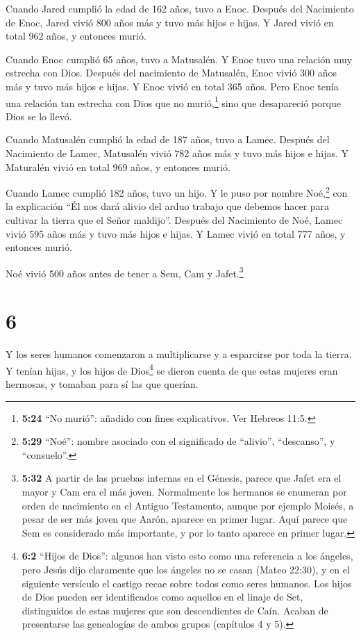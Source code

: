  Cuando Jared cumplió la edad de 162 años, tuvo a Enoc.
 Después del Nacimiento de Enoc, Jared vivió 800 años más y
tuvo más hijos e hijas.  Y Jared vivió en total 962 años, y
entonces murió.

 Cuando Enoc cumplió 65 años, tuvo a Matusalén.
 Y Enoc tuvo una relación muy estrecha con Dios. Después
del nacimiento de Matusalén, Enoc vivió 300 años más y tuvo más hijos e
hijas.  Y Enoc vivió en total 365 años.  Pero
Enoc tenía una relación tan estrecha con Dios que no murió,\footnote{\textbf{5:24}
  ``No murió'': añadido con fines explicativos. Ver Hebreos 11:5.} sino
que desapareció porque Dios se lo llevó.

 Cuando Matusalén cumplió la edad de 187 años, tuvo a
Lamec.  Después del Nacimiento de Lamec, Matusalén vivió
782 años más y tuvo más hijos e hijas.  Y Maturalén vivió
en total 969 años, y entonces murió.

 Cuando Lamec cumplió 182 años, tuvo un hijo. 
Y le puso por nombre Noé,\footnote{\textbf{5:29} ``Noé'': nombre
  asociado con el significado de ``alivio'', ``descanso'', y
  ``consuelo''.} con la explicación ``Él nos dará alivio del arduo
trabajo que debemos hacer para cultivar la tierra que el Señor
maldijo''.  Después del Nacimiento de Noé, Lamec vivió 595
años más y tuvo más hijos e hijas.  Y Lamec vivió en total
777 años, y entonces murió.

 Noé vivió 500 años antes de tener a Sem, Cam y
Jafet.\footnote{\textbf{5:32} A partir de las pruebas internas en el
  Génesis, parece que Jafet era el mayor y Cam era el más joven.
  Normalmente los hermanos se enumeran por orden de nacimiento en el
  Antiguo Testamento, aunque por ejemplo Moisés, a pesar de ser más
  joven que Aarón, aparece en primer lugar. Aquí parece que Sem es
  considerado más importante, y por lo tanto aparece en primer lugar.}

\hypertarget{section-5}{%
\section{6}\label{section-5}}

 Y los seres humanos comenzaron a multiplicarse y a
esparcirse por toda la tierra. Y tenían hijas,  y los hijos
de Dios\footnote{\textbf{6:2} ``Hijos de Dios'': algunos han visto esto
  como una referencia a los ángeles, pero Jesús dijo claramente que los
  ángeles no se casan (Mateo 22:30), y en el siguiente versículo el
  castigo recae sobre todos como seres humanos. Los hijos de Dios pueden
  ser identificados como aquellos en el linaje de Set, distinguidos de
  estas mujeres que son descendientes de Caín. Acaban de presentarse las
  genealogías de ambos grupos (capítulos 4 y 5).} se dieron cuenta de
que estas mujeres eran hermosas, y tomaban para sí las que querían.

